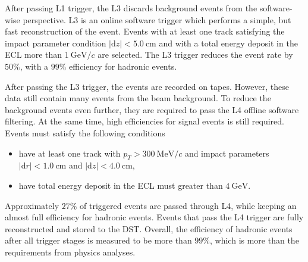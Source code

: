 \documentclass[headings=standardclasses,headings=big,oneside,a4paper,openany,12pt]{scrbook}
\newcommand {\e}[1]{\mathrm{~#1}}
\begin{document}
After passing L1 trigger, the L3 discards background events from the software-wise perspective. L3 is an online software trigger which performs a simple, but fast reconstruction of the event. Events with at least one track satisfying the impact parameter condition $\vert\mathrm{d}z \vert < 5.0\e{cm}$ and with a total energy deposit in the ECL more than $1\e{GeV}/c$ are selected. The L3 trigger reduces the event rate by $50\%$, with a $99\%$ efficiency for hadronic events.

After passing the L3 trigger, the events are recorded on tapes. However, these data still contain many events from the beam background. To reduce the background events even further, they are required to pass the L4 offline software filtering. At the same time, high efficiencies for signal events is still required. Events must satisfy the following conditions
\begin{itemize}
	\item have at least one track with $p_T > 300\e{MeV}/c$ and impact parameters $\vert \mathrm{d}r \vert < 1.0\e{cm}$ and $\vert \mathrm{d}z \vert < 4.0\e{cm}$,
	\item have total energy deposit in the ECL must greater than $4\e{GeV}$.
\end{itemize}
Approximately $27\%$ of triggered events are passed through L4, while keeping an almost full efficiency for hadronic events. Events that pass the L4 trigger are fully reconstructed and stored to the DST. Overall, the efficiency of hadronic events after all trigger stages is measured to be more than $99\%$, which is more than the requirements from physics analyses.

\printbibliography
\end{document}
